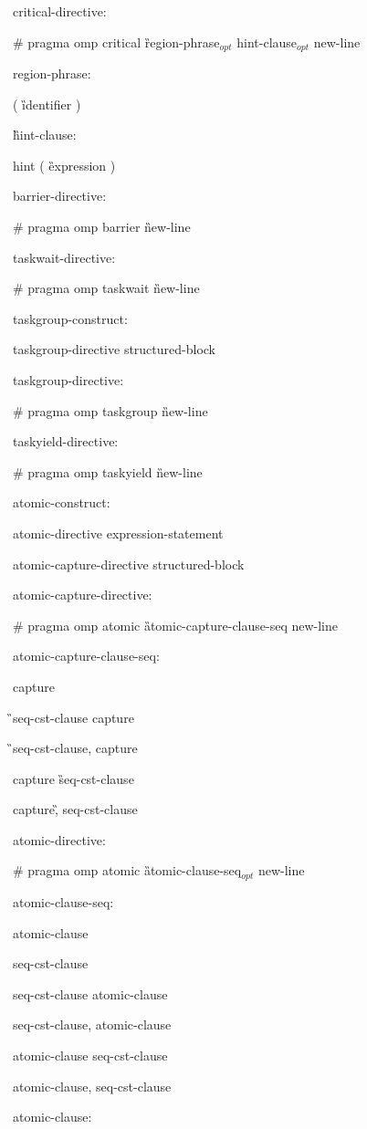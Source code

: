 {critical-directive:

\C\I \# pragma omp critical \G region-phrase$_{opt}$ hint-clause$_{opt}$ new-line

region-phrase:

\C\I ( \G identifier \C )

\G hint-clause: 

\C\I hint ( \G expression \C )

barrier-directive:

\C\I \# pragma omp barrier \G new-line

taskwait-directive:

\C\I \# pragma omp taskwait \G new-line

taskgroup-construct:

\I taskgroup-directive structured-block

taskgroup-directive:

\C\I \# pragma omp taskgroup \G new-line

taskyield-directive:

\C\I \# pragma omp taskyield \G new-line

atomic-construct:

\I atomic-directive expression-statement

\I atomic-capture-directive structured-block

atomic-capture-directive:

\C\I \# pragma omp atomic \G atomic-capture-clause-seq new-line

atomic-capture-clause-seq:

\C\I capture

\G\I seq-cst-clause \C capture

\G\I seq-cst-clause, \C capture

\I capture \G seq-cst-clause 

\C\I capture\G, seq-cst-clause 

atomic-directive:

\C\I \# pragma omp atomic \G atomic-clause-seq$_{opt}$ new-line

atomic-clause-seq:

\I atomic-clause

\I seq-cst-clause

\I seq-cst-clause atomic-clause

\I seq-cst-clause, atomic-clause

\I atomic-clause seq-cst-clause 

\I atomic-clause, seq-cst-clause 

atomic-clause:

}
